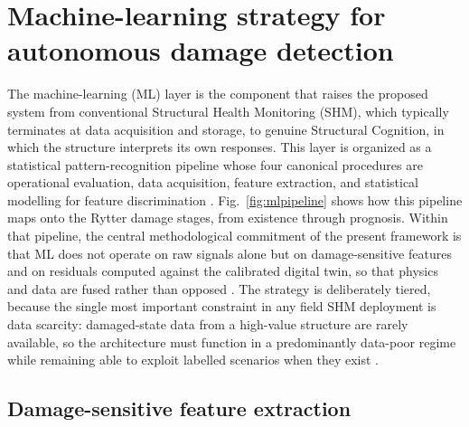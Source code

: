 \section{Machine-learning strategy for autonomous damage detection}\label{sec:ml}

The machine-learning (ML) layer is the component that raises the proposed system from conventional Structural Health Monitoring (SHM), which typically terminates at data acquisition and storage, to genuine Structural Cognition, in which the structure interprets its own responses. This layer is organized as a statistical pattern-recognition pipeline whose four canonical procedures are operational evaluation, data acquisition, feature extraction, and statistical modelling for feature discrimination \citep{farrar2013shm,farrar2007introduction}. Fig.~\ref{fig:mlpipeline} shows how this pipeline maps onto the Rytter damage stages, from existence through prognosis. Within that pipeline, the central methodological commitment of the present framework is that ML does not operate on raw signals alone but on damage-sensitive features and on residuals computed against the calibrated digital twin, so that physics and data are fused rather than opposed \citep{brunton2019data}. The strategy is deliberately tiered, because the single most important constraint in any field SHM deployment is data scarcity: damaged-state data from a high-value structure are rarely available, so the architecture must function in a predominantly data-poor regime while remaining able to exploit labelled scenarios when they exist \citep{farrar2013shm,naser2023ml,avci2021review}.

\subsection{Damage-sensitive feature extraction}\label{subsec:features}

